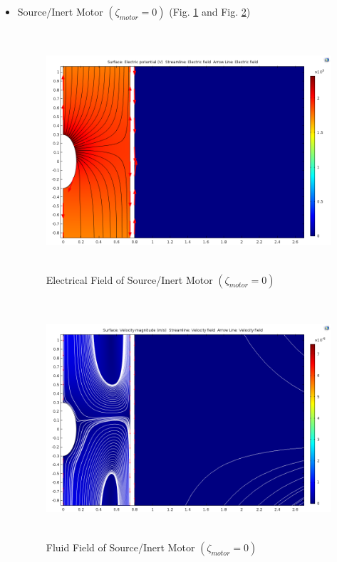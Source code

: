 \documentclass[fontsize=11pt, %
                             paper=a4, %
                             twoside, %
                             captions=tableheading,
                             index=totoc,
                             hyperref]{labbook}
\begin{document}
\begin{addmargin}[4cm]{0cm}
\begin{itemize}
\begin{figure}
\end{figure}
\item Source/Inert Motor $(\zeta_{motor}=0)$ (Fig. \ref{2016-11-13-EFOSIMM0} and Fig. \ref{2016-11-13-FFOSIMM0})
\begin{figure}
\centering
\includegraphics[width=\linewidth, height=3.5in]{2016-11-13-SourceInert-E-Osmosis.png}
\caption{Electrical Field of Source/Inert Motor $(\zeta_{motor}=0)$}\label{2016-11-13-EFOSIMM0}
\end{figure}
\begin{figure}
\centering
\includegraphics[width=\linewidth, height=3.5in]{2016-11-13-SourceInert-V-Osmosis.png}
\caption{Fluid Field of Source/Inert Motor $(\zeta_{motor}=0)$}\label{2016-11-13-FFOSIMM0}
\end{figure}
\end{itemize}

\end{addmargin}
\end{document}
